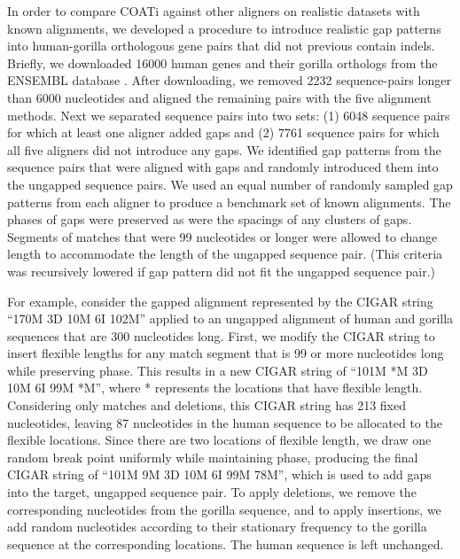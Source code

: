 \documentclass[12pt,letterpaper]{article}
\begin{document}
In order to compare COATi against other aligners on realistic datasets with known alignments, we developed a procedure to introduce realistic gap patterns into human-gorilla orthologous gene pairs that did not previous contain indels. Briefly, we downloaded 16000 human genes and their gorilla orthologs from the ENSEMBL database \citep{ensembl_hubbard_2002}. After downloading, we removed 2232 sequence-pairs longer than 6000 nucleotides and aligned the remaining pairs with the five alignment methods. Next we separated sequence pairs into two sets: (1) 6048 sequence pairs for which at least one aligner added gaps and (2) 7761 sequence pairs for which all five aligners did not introduce any gaps. We identified gap patterns from the sequence pairs that were aligned with gaps and randomly introduced them into the ungapped sequence pairs. We used an equal number of randomly sampled gap patterns from each aligner to produce a benchmark set of known alignments. The phases of gaps were preserved as were the spacings of any clusters of gaps. Segments of matches that were 99 nucleotides or longer were allowed to change length to accommodate the length of the ungapped sequence pair. (This criteria was recursively lowered if gap pattern did not fit the ungapped sequence pair.)

For example, consider the gapped alignment represented by the CIGAR string
%
``170M 3D 10M 6I 102M'' %
%
applied to an ungapped alignment of human and gorilla sequences that are 300 nucleotides long. First, we modify the CIGAR string to insert flexible lengths for any match segment that is 99 or more nucleotides long while preserving phase. This results in a new CIGAR string of
%
``101M *M 3D 10M 6I 99M *M'',
%
where * represents the locations that have flexible length. Considering only matches and deletions, this CIGAR string has 213 fixed nucleotides, leaving 87 nucleotides in the human sequence to be allocated to the flexible locations. Since there are two locations of flexible length, we draw one random break point uniformly while maintaining phase, producing the final CIGAR string of
%
``101M 9M 3D 10M 6I 99M 78M'',
%
which is used to add gaps into the target, ungapped sequence pair.
To apply deletions, we remove the corresponding nucleotides from the gorilla sequence, and to apply insertions, we add random nucleotides according to their stationary frequency to the gorilla sequence at the corresponding locations. The human sequence is left unchanged.
\end{document}
